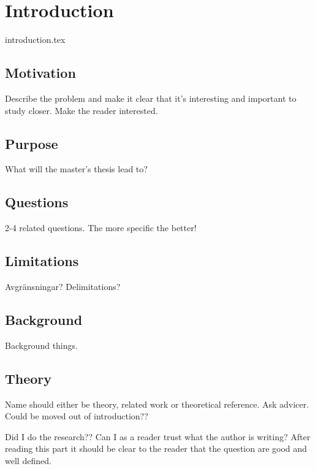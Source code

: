 \chapter{Introduction}\label{cha:intro}

introduction.tex


\section{Motivation}\label{sec:motivation}

Describe the problem and make it clear that it's interesting and important to study closer. Make the reader interested.


\section{Purpose}\label{sec:purpose}

What will the master's thesis lead to?


\section{Questions}\label{sec:questions}

2-4 related questions. The more specific the better!


\section{Limitations}\label{sec:limitations}

Avgränsningar? Delimitations?


\section{Background}\label{sec:background}

Background things.


\section{Theory}\label{sec:theory}

Name should either be theory, related work or theoretical reference. Ask advicer. Could be moved out of introduction??

Did I do the research?? Can I as a reader trust what the author is writing? After reading this part it should be clear to the reader that the question are good and well defined.
